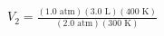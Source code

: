 \documentclass[preview]{standalone}
\begin{document}
\begin{align*}
V_2 = \frac{(1.0 \text{ atm})(3.0 \text{ L})(400 \text{ K})}{(2.0 \text{ atm})(300 \text{ K})}
\end{align*}
\end{document}

